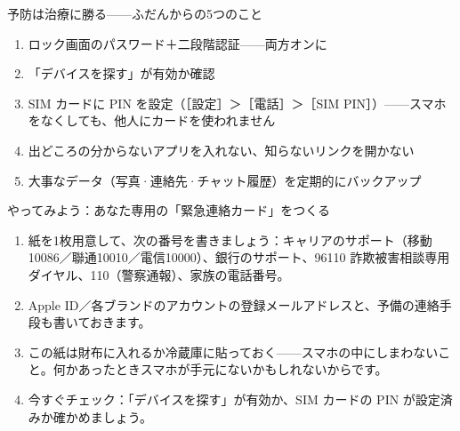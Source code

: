 \begin{tcbwarn}{予防は治療に勝る——ふだんからの5つのこと}
\begin{enumerate}
  \item ロック画面のパスワード＋二段階認証——両方オンに
  \item 「デバイスを探す」が有効か確認
  \item SIM カードに PIN を設定（［設定］＞［電話］＞［SIM PIN］）——スマホをなくしても、他人にカードを使われません
  \item 出どころの分からないアプリを入れない、知らないリンクを開かない
  \item 大事なデータ（写真·連絡先·チャット履歴）を定期的にバックアップ
\end{enumerate}

\end{tcbwarn}

\begin{tcbpractice}{やってみよう：あなた専用の「緊急連絡カード」をつくる}
\begin{enumerate}
  \item 紙を1枚用意して、次の番号を書きましょう：キャリアのサポート（移動10086／聯通10010／電信10000）、銀行のサポート、96110 詐欺被害相談専用ダイヤル、110（警察通報）、家族の電話番号。
  \item Apple ID／各ブランドのアカウントの登録メールアドレスと、予備の連絡手段も書いておきます。
  \item この紙は財布に入れるか冷蔵庫に貼っておく——スマホの中にしまわないこと。何かあったときスマホが手元にないかもしれないからです。
  \item 今すぐチェック：「デバイスを探す」が有効か、SIM カードの PIN が設定済みか確かめましょう。
\end{enumerate}

\end{tcbpractice}

